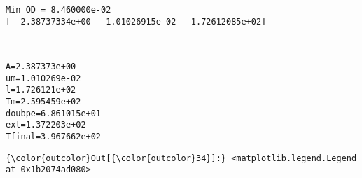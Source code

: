 \documentclass[11pt]{article}
\begin{document}
    \begin{Verbatim}[commandchars=\\\{\}]
Min OD = 8.460000e-02
[  2.38737334e+00   1.01026915e-02   1.72612085e+02]

    \end{Verbatim}

    \begin{center}
    \end{center}
    { \hspace*{\fill} \\}
    
    \begin{Verbatim}[commandchars=\\\{\}]
A=2.387373e+00
um=1.010269e-02
l=1.726121e+02
Tm=2.595459e+02
doubpe=6.861015e+01
ext=1.372203e+02
Tfinal=3.967662e+02

    \end{Verbatim}

            \begin{Verbatim}[commandchars=\\\{\}]
{\color{outcolor}Out[{\color{outcolor}34}]:} <matplotlib.legend.Legend at 0x1b2074ad080>
\end{Verbatim}
        
    \begin{center}
    \end{center}
    { \hspace*{\fill} \\}
    
    \begin{center}
    \end{center}
    { \hspace*{\fill} \\}
    
\end{document}
